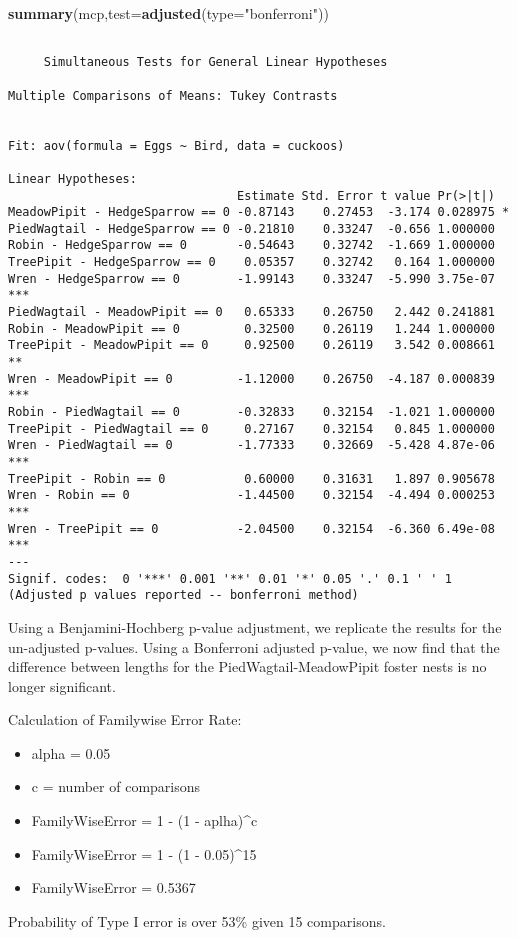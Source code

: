 \documentclass[]{article}
\newenvironment{Shaded}{\begin{snugshade}}{\end{snugshade}}
\newcommand{\KeywordTok}[1]{\textcolor[rgb]{0.13,0.29,0.53}{\textbf{#1}}}
\newcommand{\DataTypeTok}[1]{\textcolor[rgb]{0.13,0.29,0.53}{#1}}
\newcommand{\StringTok}[1]{\textcolor[rgb]{0.31,0.60,0.02}{#1}}
\newcommand{\NormalTok}[1]{#1}
\providecommand{\tightlist}{%
  \setlength{\itemsep}{0pt}\setlength{\parskip}{0pt}}
\begin{document}
\begin{Shaded}
\begin{Highlighting}[]
\KeywordTok{summary}\NormalTok{(mcp,}\DataTypeTok{test=}\KeywordTok{adjusted}\NormalTok{(}\DataTypeTok{type=}\StringTok{"bonferroni"}\NormalTok{))}
\end{Highlighting}
\end{Shaded}

\begin{verbatim}

     Simultaneous Tests for General Linear Hypotheses

Multiple Comparisons of Means: Tukey Contrasts


Fit: aov(formula = Eggs ~ Bird, data = cuckoos)

Linear Hypotheses:
                                Estimate Std. Error t value Pr(>|t|)    
MeadowPipit - HedgeSparrow == 0 -0.87143    0.27453  -3.174 0.028975 *  
PiedWagtail - HedgeSparrow == 0 -0.21810    0.33247  -0.656 1.000000    
Robin - HedgeSparrow == 0       -0.54643    0.32742  -1.669 1.000000    
TreePipit - HedgeSparrow == 0    0.05357    0.32742   0.164 1.000000    
Wren - HedgeSparrow == 0        -1.99143    0.33247  -5.990 3.75e-07 ***
PiedWagtail - MeadowPipit == 0   0.65333    0.26750   2.442 0.241881    
Robin - MeadowPipit == 0         0.32500    0.26119   1.244 1.000000    
TreePipit - MeadowPipit == 0     0.92500    0.26119   3.542 0.008661 ** 
Wren - MeadowPipit == 0         -1.12000    0.26750  -4.187 0.000839 ***
Robin - PiedWagtail == 0        -0.32833    0.32154  -1.021 1.000000    
TreePipit - PiedWagtail == 0     0.27167    0.32154   0.845 1.000000    
Wren - PiedWagtail == 0         -1.77333    0.32669  -5.428 4.87e-06 ***
TreePipit - Robin == 0           0.60000    0.31631   1.897 0.905678    
Wren - Robin == 0               -1.44500    0.32154  -4.494 0.000253 ***
Wren - TreePipit == 0           -2.04500    0.32154  -6.360 6.49e-08 ***
---
Signif. codes:  0 '***' 0.001 '**' 0.01 '*' 0.05 '.' 0.1 ' ' 1
(Adjusted p values reported -- bonferroni method)
\end{verbatim}

Using a Benjamini-Hochberg p-value adjustment, we replicate the results
for the un-adjusted p-values. Using a Bonferroni adjusted p-value, we
now find that the difference between lengths for the
PiedWagtail-MeadowPipit foster nests is no longer significant.

Calculation of Familywise Error Rate:

\begin{itemize}
\tightlist
\item
  alpha = 0.05
\item
  c = number of comparisons
\item
  FamilyWiseError = 1 - (1 - aplha)\^{}c
\item
  FamilyWiseError = 1 - (1 - 0.05)\^{}15
\item
  FamilyWiseError = 0.5367
\end{itemize}

Probability of Type I error is over 53\% given 15 comparisons.
\end{document}
